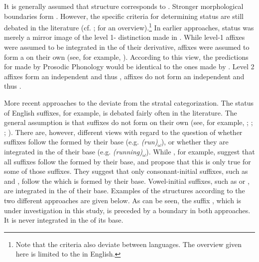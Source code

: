 It is generally assumed that  structure corresponds to . Stronger morphological boundaries form . However, the specific criteria for determining  status are still debated in the literature (cf. \citealt{Raffelsiefen.1999}; \citealt{Hall.2001} for an overview).\footnote{Note that the criteria also deviate between languages. The overview given here is limited to the  in English.} 
In earlier approaches,  status was merely a mirror image of the level 1- distinction made in . While level-1 affixes were assumed to be integrated in the  of their derivative,  affixes were assumed to form a  on their own (see, for example, \citealt{Aronoff.1983,Booij.1983b,Szpyra.1989}). According to this view, the predictions for  made by Prosodic Phonology would be identical to the ones made by . Level 2 affixes form an independent  and thus ,  affixes do not form an independent  and thus . 

More recent approaches to the  deviate from the stratal categorization. The  status of English suffixes, for example, is debated fairly often in the literature. The general assumption is that suffixes do not form  on their own (see, for example, \citealt[311]{Wennerstrom.1993}; \citealt[184]{Raffelsiefen.1999}; \citealt[401]{Hall.2001b}; \citealt{Sugahara.2009}). There are, however, different views with regard to the question of whether suffixes follow the  formed by their base (e.g. \textit{(run)\textsubscript{$\omega$}}), or whether they are integrated in the  of their base (e.g. \textit{(running)\textsubscript{$\omega$}}). While \cite{Sugahara.2009}, for example, suggest that all  suffixes follow the  formed by their base, \cite{Raffelsiefen.1999} and \cite{Hall.2001b} propose that this is only true for some of those suffixes. They suggest that only consonant-initial suffixes, such as  and , follow the  which is formed by their base. Vowel-initial suffixes, such as  or , are integrated in the  of their base. Examples of the  structures according to the two different approaches are given below. As can be seen, the suffix , which is under investigation in this study, is preceded by a  boundary in both approaches. It is never integrated in the  of its base.


